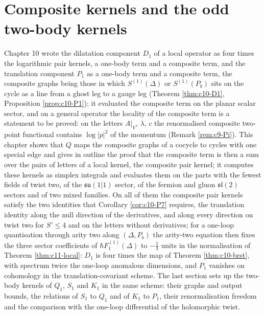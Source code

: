 \chapter{Composite kernels and the odd two-body kernels}

Chapter 10 wrote the dilatation component $D_1$ of a local operator as four times the logarithmic pair kernels, a one-body term and a composite term, and the translation component $P_1$ as a one-body term and a composite term, the composite graphs being those in which $S^{(1)}(\Delta)$ or $S^{(1)}(P_b)$ sits on the cycle as a line from a ghost leg to a gauge leg (Theorem \ref{thm:c10-D1}, Proposition \ref{prop:c10-P1}); it evaluated the composite term on the planar scalar sector, and on a general operator the locality of the composite term is a statement to be proved: on the letters $A|_V$, $\lambda$, $c$ the renormalised composite two-point functional contains $\log|p|^2$ of the momentum (Remark \ref{rem:c9-Pi}). This chapter shows that $Q$ maps the composite graphs of a cocycle to cycles with one special edge and gives in outline the proof that the composite term is then a sum over the pairs of letters of a local kernel, the composite pair kernel; it computes these kernels as simplex integrals and evaluates them on the parts with the fewest fields of twist two, of the $\mathfrak{su}(1|1)$ sector, of the fermion and gluon $\mathfrak{sl}(2)$ sectors and of two mixed families. On all of them the composite pair kernels satisfy the two identities that Corollary \ref{cor:c10-P7} requires, the translation identity along the null direction of the derivatives, and along every direction on twist two for $S'\le4$ and on the letters without derivatives; for a one-loop quantisation through arity two along $(\Delta,P_b)$ the arity-two equation then fixes the three sector coefficients of $\hbar F_1^{(1)}(\Delta)$ to $-\tfrac13$ units in the normalisation of Theorem \ref{thm:c11-local}: $D_1$ is four times the map of Theorem \ref{thm:c10-brst}, with spectrum twice the one-loop anomalous dimensions, and $P_1$ vanishes on cohomology in the translation-covariant scheme. The last section sets up the two-body kernels of $Q_1$, $S_1$ and $K_1$ in the same scheme: their graphs and output bounds, the relations of $S_1$ to $Q_1$ and of $K_1$ to $P_1$, their renormalisation freedom and the comparison with the one-loop differential of the holomorphic twist.

